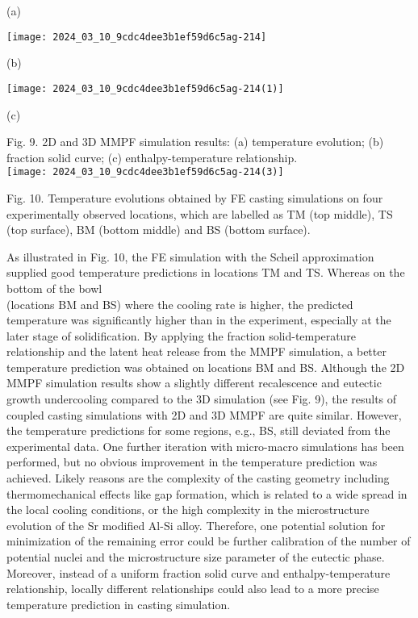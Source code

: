 \documentclass[10pt]{article}
\begin{document}
(a)

\begin{center}
\texttt{[image: 2024\_03\_10\_9cdc4dee3b1ef59d6c5ag-214]}
\end{center}

(b)

\begin{center}
\texttt{[image: 2024\_03\_10\_9cdc4dee3b1ef59d6c5ag-214(1)]}
\end{center}

(c)

Fig. 9. 2D and 3D MMPF simulation results: (a) temperature evolution; (b) fraction solid curve; (c) enthalpy-temperature relationship.\\
\texttt{[image: 2024\_03\_10\_9cdc4dee3b1ef59d6c5ag-214(3)]}

Fig. 10. Temperature evolutions obtained by FE casting simulations on four experimentally observed locations, which are labelled as TM (top middle), TS (top surface), BM (bottom middle) and BS (bottom surface).

As illustrated in Fig. 10, the FE simulation with the Scheil approximation supplied good temperature predictions in locations TM and TS. Whereas on the bottom of the bowl\\
(locations BM and BS) where the cooling rate is higher, the predicted temperature was significantly higher than in the experiment, especially at the later stage of solidification. By applying the fraction solid-temperature relationship and the latent heat release from the MMPF simulation, a better temperature prediction was obtained on locations BM and BS. Although the 2D MMPF simulation results show a slightly different recalescence and eutectic growth undercooling compared to the 3D simulation (see Fig. 9), the results of coupled casting simulations with 2D and 3D MMPF are quite similar. However, the temperature predictions for some regions, e.g., BS, still deviated from the experimental data. One further iteration with micro-macro simulations has been performed, but no obvious improvement in the temperature prediction was achieved. Likely reasons are the complexity of the casting geometry including thermomechanical effects like gap formation, which is related to a wide spread in the local cooling conditions, or the high complexity in the microstructure evolution of the Sr modified Al-Si alloy. Therefore, one potential solution for minimization of the remaining error could be further calibration of the number of potential nuclei and the microstructure size parameter of the eutectic phase. Moreover, instead of a uniform fraction solid curve and enthalpy-temperature relationship, locally different relationships could also lead to a more precise temperature prediction in casting simulation.
\end{document}
